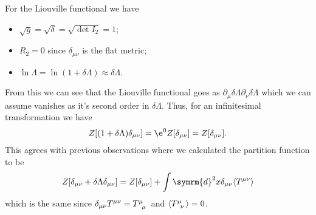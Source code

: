 \documentclass[fleqn]{NotesClass}
\renewcommand{\dl}[1]{\symrm{d}#1}
\DeclarePairedDelimiter{\correlator}{\langle}{\rangle}
\begin{document}
    For the Liouville functional we have
    \begin{itemize}
        \item \(\sqrt{g} = \sqrt{\delta} = \sqrt{\det I_2} = 1\);
        \item \(R_2 = 0\) since \(\delta_{\mu\nu}\) is the flat metric;
        \item \(\ln \Lambda = \ln(1 + \delta \Lambda) \approx \delta \Lambda\).
    \end{itemize}
    From this we can see that the Liouville functional goes as \(\partial_\mu \delta \Lambda \partial_\nu \delta \Lambda\) which we can assume vanishes as it's second order in \(\delta \Lambda\).
    Thus, for an infinitesimal transformation we have
    \begin{equation}
        Z[(1 + \delta \Lambda)\delta_{\mu\nu}] = \e^0 Z[\delta_{\mu\nu}] = Z[\delta_{\mu\nu}].
    \end{equation}
    This agrees with previous observations where we calculated the partition function to be
    \begin{equation}
        Z[\delta_{\mu\nu} + \delta \Lambda \delta_{\mu\nu}] = Z[\delta_{\mu\nu}] + \int \dl{^2x} \delta_{\mu\nu} \correlator{T^{\mu\nu}}
    \end{equation}
    which is the same since \(\delta_{\mu\nu}T^{\mu\nu} = \tensor{T}{^\mu_\mu}\) and \(\correlator{\tensor{T}{^\mu_\nu}} = 0\).
    
\end{document}
